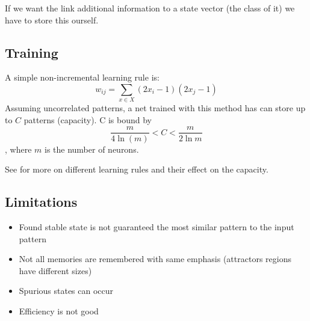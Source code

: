 If we want the link additional information to a state vector (\eg the class of it) we have to store this ourself.

\subsection{Training}
A simple non-incremental learning rule is:
\begin{equation}
w_{ij} = \sum_{x \in X} (2x_i-1)(2x_j-1)
\end{equation}
Assuming uncorrelated patterns, a net trained with this method has can store up to $C$ patterns (capacity). C is bound by
\begin{equation}
\frac{m}{4 \ln(m)} < C < \frac{m}{2\ln{m}}
\end{equation}
, where $m$ is the number of neurons.


See \cite{Storkey1997} for more on different learning rules and their effect on the capacity.

\subsection{Limitations}
\begin{itemize}
\item Found stable state is not guaranteed the most similar pattern to the input pattern
\item Not all memories are remembered with same emphasis (attractors regions have different sizes)
\item Spurious states can occur
\item Efficiency is not good
\end{itemize}